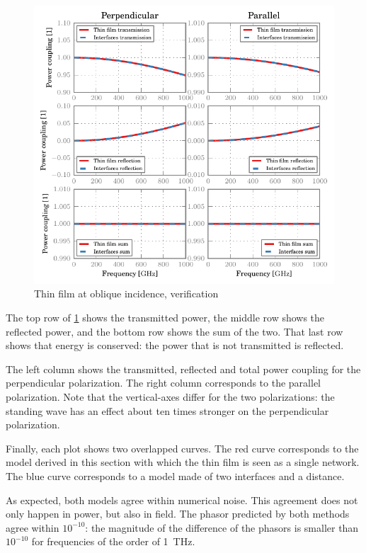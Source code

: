 \begin{figure}[hbtp]
    \centering
    \includegraphics{thin_film_oblique_verification}
    \caption{Thin film at oblique incidence, verification}
    \label{fig:thin_film_oblique_verification}
\end{figure}

The top row of \cref{fig:thin_film_oblique_verification} shows the transmitted power, the middle row shows the reflected power, and the bottom row shows the sum of the two.
That last row shows that energy is conserved: the power that is not transmitted is reflected.

The left column shows the transmitted, reflected and total power coupling for the perpendicular polarization.
The right column corresponds to the parallel polarization.
Note that the vertical-axes differ for the two polarizations: the standing wave has an effect about ten times stronger on the perpendicular polarization.

Finally, each plot shows two overlapped curves.
The red curve corresponds to the model derived in this section with which the thin film is seen as a single network.
The blue curve corresponds to a model made of two interfaces and a distance.

As expected, both models agree within numerical noise.
This agreement does not only happen in power, but also in field.
The phasor predicted by both methods agree within $10^{-10}$: the magnitude of the difference of the phasors is smaller than $10^{-10}$ for frequencies of the order of \SI{1}{\tera\hertz}.  



